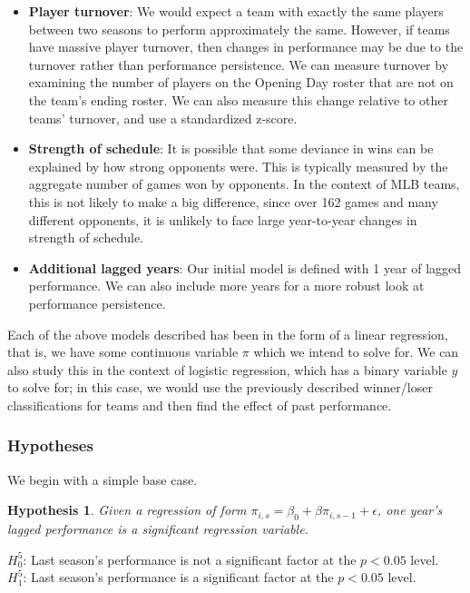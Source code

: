 \documentclass[11pt,]{scrartcl}
\newtheorem{hypothesis}{Hypothesis}
\providecommand{\tightlist}{%
  \setlength{\itemsep}{0pt}\setlength{\parskip}{0pt}}
\begin{document}
\begin{itemize}
\tightlist
\item
  \textbf{Player turnover}: We would expect a team with exactly the same
  players between two seasons to perform approximately the same.
  However, if teams have massive player turnover, then changes in
  performance may be due to the turnover rather than performance
  persistence. We can measure turnover by examining the number of
  players on the Opening Day roster that are not on the team's ending
  roster. We can also measure this change relative to other teams'
  turnover, and use a standardized z-score.
\item
  \textbf{Strength of schedule}: It is possible that some deviance in
  wins can be explained by how strong opponents were. This is typically
  measured by the aggregate number of games won by opponents. In the
  context of MLB teams, this is not likely to make a big difference,
  since over 162 games and many different opponents, it is unlikely to
  face large year-to-year changes in strength of schedule.
\item
  \textbf{Additional lagged years}: Our initial model is defined with 1
  year of lagged performance. We can also include more years for a more
  robust look at performance persistence.
\end{itemize}

Each of the above models described has been in the form of a linear
regression, that is, we have some continuous variable \(\pi\) which we
intend to solve for. We can also study this in the context of logistic
regression, which has a binary variable \(y\) to solve for; in this
case, we would use the previously described winner/loser classifications
for teams and then find the effect of past performance.

\subsubsection{Hypotheses}\label{hypotheses-1}

We begin with a simple base case.

\begin{framed}
\begin{hypothesis}
Given a regression of form $\pi_{i,s} = \beta_0 + \beta \pi_{i, s-1} + \epsilon$, one year's lagged performance is a significant regression variable.
\end{hypothesis}

\noindent $H_0^5$: Last season's performance is not a significant factor at the $p < 0.05$ level. \\
$H_1^5$: Last season's performance is a significant factor at the $p < 0.05$ level.
\end{framed}
\end{document}
